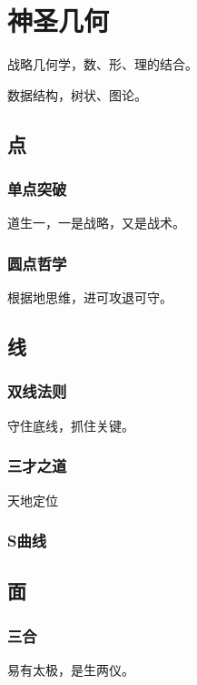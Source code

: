 \chapter{神圣几何}

战略几何学，数、形、理的结合。

数据结构，树状、图论。

\section{点}

\subsection{单点突破}

道生一，一是战略，又是战术。

\subsection{圆点哲学}

根据地思维，进可攻退可守。

\section{线}

\subsection{双线法则}

守住底线，抓住关键。

\subsection{三才之道}

天地定位

\subsection{S曲线}

\section{面}

\subsection{三合}

易有太极，是生两仪。

